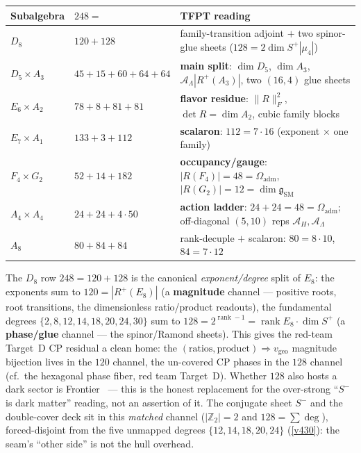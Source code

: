 \documentclass[11pt,a4paper]{article}
\newcommand{\Oadm}{\Omega_{\mathrm{adm}}}
\newcommand{\AL}{\mathcal A_\Lambda}
\newcommand{\AH}{\mathcal A_H}
\newcommand{\Z}{\mathbb{Z}}
\theoremstyle{definition}
\renewcommand{\arraystretch}{1.15}
\begin{document}
\begin{center}\small
\renewcommand{\arraystretch}{1.3}
\begin{tabularx}{\linewidth}{@{}p{2.1cm}p{4.1cm}Y@{}}
\toprule
\textbf{Subalgebra} & \textbf{$248=$} & \textbf{TFPT reading} \\
\midrule
$D_8$ & $120+128$ & family-transition adjoint $+$ two spinor-glue sheets ($128{=}2\dim S^+|\mu_4|$) \\
$D_5\times A_3$ & $45+15+60+64+64$ & \textbf{main split}: $\dim D_5$, $\dim A_3$, $\AL|R^+(A_3)|$, two $(16,4)$ glue sheets \\
$E_6\times A_2$ & $78+8+81+81$ & \textbf{flavor residue}: $\|R\|_F^2$, $\det R{=}\dim A_2$, cubic family blocks \\
$E_7\times A_1$ & $133+3+112$ & \textbf{scalaron}: $112{=}7\cdot16$ (exponent $\times$ one family) \\
$F_4\times G_2$ & $52+14+182$ & \textbf{occupancy/gauge}: $|R(F_4)|{=}48{=}\Oadm$, $|R(G_2)|{=}12{=}\dim\mathfrak g_{\mathrm{SM}}$ \\
$A_4\times A_4$ & $24+24+4\cdot50$ & \textbf{action ladder}: $24{+}24{=}48{=}\Oadm$; off-diagonal $(5,10)$ reps $\AH,\AL$ \\
$A_8$ & $80+84+84$ & rank-decuple $+$ scalaron: $80{=}8\cdot10$, $84{=}7\cdot12$ \\
\bottomrule
\end{tabularx}
\end{center}

\begin{keybox}
The $D_8$ row $248=120+128$ is the canonical \emph{exponent/degree} split of $E_8$: the exponents sum to
$120=|R^+(E_8)|$ (a \textbf{magnitude} channel --- positive roots, root transitions, the dimensionless
ratio/product readouts), the fundamental degrees $\{2,8,12,14,18,20,24,30\}$ sum to
$128=2^{\operatorname{rank}-1}=\operatorname{rank}E_8\cdot\dim S^+$ (a \textbf{phase/glue} channel --- the
spinor/Ramond sheets). This gives the red-team Target~D CP residual a clean home: the
$(\text{ratios},\text{product})\Rightarrow v_{\mathrm{geo}}$ magnitude bijection lives in the $120$ channel,
the un-covered CP phases in the $128$ channel (cf.\ the hexagonal phase fiber, red team Target~D). Whether
$128$ also hosts a dark sector is Frontier \mO\ --- this is the honest replacement for the over-strong
``$S^-$ is dark matter'' reading, not an assertion of it. The conjugate sheet $S^-$ and the double-cover
deck sit in this \emph{matched} channel ($|\Z_2|=2$ and $128=\sum\deg$), forced-disjoint from the five
unmapped degrees $\{12,14,18,20,24\}$ (\vref{v430}): the seam's ``other side'' is not the hull overhead.
\end{keybox}
\end{document}

